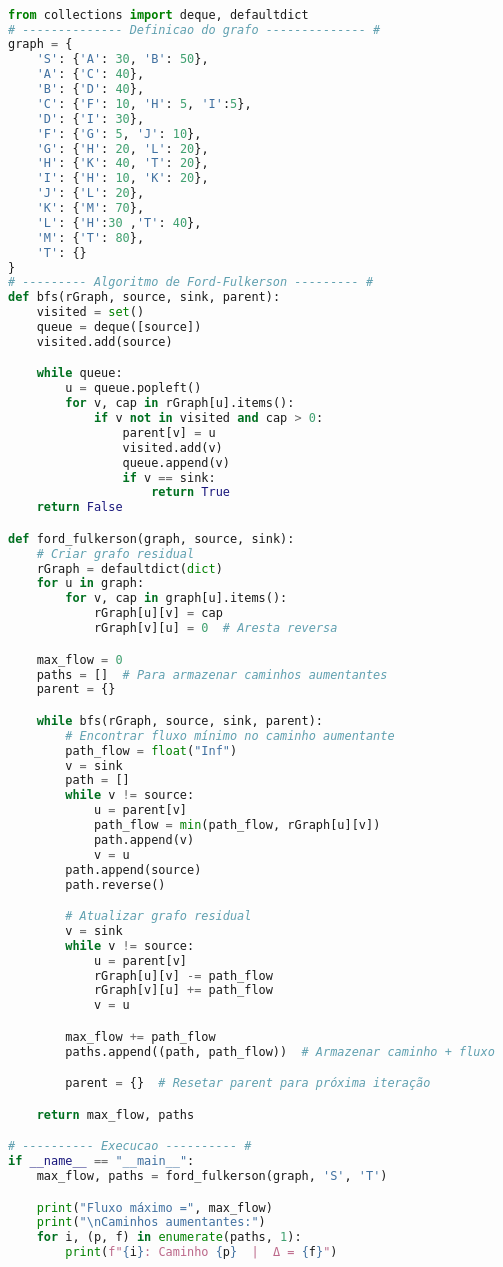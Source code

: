 \documentclass[12pt]{article}
\begin{document}
\begin{lstlisting}[language=Python, caption={}, label={lst:fordfulkerson}]

from collections import deque, defaultdict
# -------------- Definicao do grafo -------------- #
graph = {
    'S': {'A': 30, 'B': 50},
    'A': {'C': 40},
    'B': {'D': 40},
    'C': {'F': 10, 'H': 5, 'I':5},
    'D': {'I': 30},
    'F': {'G': 5, 'J': 10},
    'G': {'H': 20, 'L': 20},
    'H': {'K': 40, 'T': 20},
    'I': {'H': 10, 'K': 20},
    'J': {'L': 20},
    'K': {'M': 70},
    'L': {'H':30 ,'T': 40},
    'M': {'T': 80},
    'T': {}
}
# --------- Algoritmo de Ford-Fulkerson --------- #
def bfs(rGraph, source, sink, parent):
    visited = set()
    queue = deque([source])
    visited.add(source)

    while queue:
        u = queue.popleft()
        for v, cap in rGraph[u].items():
            if v not in visited and cap > 0:
                parent[v] = u
                visited.add(v)
                queue.append(v)
                if v == sink:
                    return True
    return False

def ford_fulkerson(graph, source, sink):
    # Criar grafo residual
    rGraph = defaultdict(dict)
    for u in graph:
        for v, cap in graph[u].items():
            rGraph[u][v] = cap
            rGraph[v][u] = 0  # Aresta reversa

    max_flow = 0
    paths = []  # Para armazenar caminhos aumentantes
    parent = {}

    while bfs(rGraph, source, sink, parent):
        # Encontrar fluxo mínimo no caminho aumentante
        path_flow = float("Inf")
        v = sink
        path = []
        while v != source:
            u = parent[v]
            path_flow = min(path_flow, rGraph[u][v])
            path.append(v)
            v = u
        path.append(source)
        path.reverse()

        # Atualizar grafo residual
        v = sink
        while v != source:
            u = parent[v]
            rGraph[u][v] -= path_flow
            rGraph[v][u] += path_flow
            v = u

        max_flow += path_flow
        paths.append((path, path_flow))  # Armazenar caminho + fluxo

        parent = {}  # Resetar parent para próxima iteração

    return max_flow, paths

# ---------- Execucao ---------- #
if __name__ == "__main__":
    max_flow, paths = ford_fulkerson(graph, 'S', 'T')

    print("Fluxo máximo =", max_flow)
    print("\nCaminhos aumentantes:")
    for i, (p, f) in enumerate(paths, 1):
        print(f"{i}: Caminho {p}  |  Δ = {f}")
\end{lstlisting}
\end{document}
